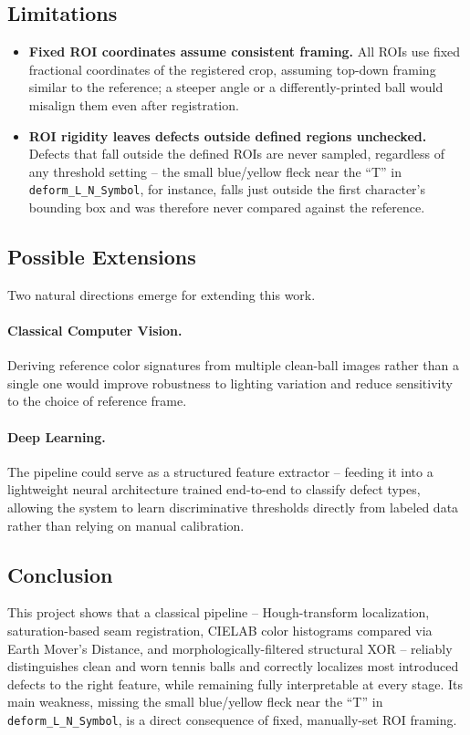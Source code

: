 \documentclass[11pt,a4paper]{article}
\begin{document}
\subsection{Limitations}
\begin{itemize}
\item \textbf{Fixed ROI coordinates assume consistent framing.} All ROIs
use fixed fractional coordinates of the registered crop, assuming
top-down framing similar to the reference; a steeper angle or a
differently-printed ball would misalign them even after registration.

\item \textbf{ROI rigidity leaves defects outside defined regions unchecked.}
Defects that fall outside the defined ROIs are never sampled, regardless of
any threshold setting -- the small blue/yellow fleck near the ``T'' in
\texttt{deform\_L\_N\_Symbol}, for instance, falls just outside the first
character's bounding box and was therefore never compared against the reference.
\end{itemize}

\subsection{Possible Extensions}
Two natural directions emerge for extending this work.

\paragraph{Classical Computer Vision.}
Deriving reference color signatures from multiple clean-ball images
rather than a single one would improve robustness to lighting variation
and reduce sensitivity to the choice of reference frame.

\paragraph{Deep Learning.}
The pipeline could serve as a structured feature extractor -- feeding
it into a lightweight neural architecture
trained end-to-end to classify defect types, allowing the system to
learn discriminative thresholds directly from labeled data rather than
relying on manual calibration.

\subsection{Conclusion}

This project shows that a classical pipeline -- Hough-transform
localization, saturation-based seam registration, CIELAB color histograms
compared via Earth Mover's Distance, and morphologically-filtered
structural XOR -- reliably distinguishes clean and worn tennis balls and
correctly localizes most introduced defects to the right feature, while
remaining fully interpretable at every stage. Its main weakness, missing the small blue/yellow fleck near the ``T'' in
\texttt{deform\_L\_N\_Symbol}, is a direct consequence of fixed,
manually-set ROI framing.
\end{document}
